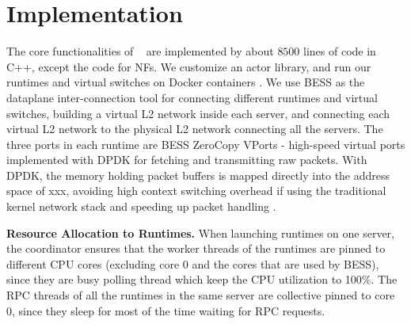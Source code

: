 \section{Implementation}
\label{sec:implementation}


The core functionalities of \nfactor~ are implemented by about $8500$ lines of code in C++, except the code for NFs. We customize an actor library, and run our runtimes and virtual switches on Docker containers \cite{docker}. We use BESS \cite{bess} as the dataplane inter-connection tool for connecting different runtimes and virtual switches, building a virtual L2 network inside each server, and connecting each virtual L2 network to the physical L2 network connecting all the servers. The three ports in each runtime are BESS ZeroCopy VPorts - high-speed virtual ports implemented with DPDK for fetching and transmitting raw packets. With DPDK, the memory holding packet buffers is mapped directly into the address space of xxx, avoiding high context switching overhead if using the traditional kernel network stack and speeding up packet handling \cite{martins2014clickos}. %

\vspace{1mm}
\noindent \textbf{Resource Allocation to Runtimes.} %
When launching runtimes on one server, the coordinator ensures that the worker threads of the runtimes are pinned to different CPU cores (excluding core 0 and the cores that are used by BESS), since they are busy polling thread which keep the CPU utilization to 100\%. The RPC threads of all the runtimes in the same server are collective pinned to core 0, since they sleep for most of the time waiting for RPC requests.  %

